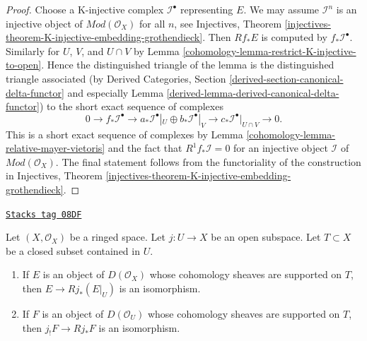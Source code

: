 \begin{proof}

Choose a K-injective complex $\mathcal{I}^\bullet$
representing $E$. We may assume $\mathcal{I}^n$ is an injective
object of $\textit{Mod}(\mathcal{O}_X)$ for all $n$, see
Injectives, Theorem
\ref{injectives-theorem-K-injective-embedding-grothendieck}.
Then $Rf_*E$ is computed by $f_*\mathcal{I}^\bullet$.
Similarly for $U$, $V$, and $U \cap V$ by
Lemma \ref{cohomology-lemma-restrict-K-injective-to-open}.
Hence the distinguished triangle of the lemma is the distinguished
triangle associated (by
Derived Categories, Section
\ref{derived-section-canonical-delta-functor} and especially
Lemma \ref{derived-lemma-derived-canonical-delta-functor})
to the short exact sequence of complexes
$$
0 \to
f_*\mathcal{I}^\bullet \to
a_*\mathcal{I}^\bullet|_U \oplus b_*\mathcal{I}^\bullet|_V \to
c_*\mathcal{I}^\bullet|_{U \cap V} \to
0.
$$
This is a short exact sequence of complexes by
Lemma \ref{cohomology-lemma-relative-mayer-vietoris}
and the fact that $R^1f_*\mathcal{I} = 0$
for an injective object $\mathcal{I}$ of $\textit{Mod}(\mathcal{O}_X)$.
The final statement follows from the functoriality of the construction
in Injectives, Theorem
\ref{injectives-theorem-K-injective-embedding-grothendieck}.
\end{proof}

\begin{lemma}
\label{cohomology-lemma-pushforward-restriction}
\href{https://stacks.math.columbia.edu/tag/08DF}{\texttt{Stacks tag 08DF}}

Let $(X, \mathcal{O}_X)$ be a ringed space. Let $j : U \to X$ be an
open subspace. Let $T \subset X$ be a closed subset contained in $U$.
\begin{enumerate}
\item If $E$ is an object of $D(\mathcal{O}_X)$ whose cohomology sheaves
are supported on $T$, then $E \to Rj_*(E|_U)$ is an isomorphism.
\item If $F$ is an object of $D(\mathcal{O}_U)$ whose cohomology sheaves
are supported on $T$, then $j_!F \to Rj_*F$ is an isomorphism.
\end{enumerate}
\end{lemma}

